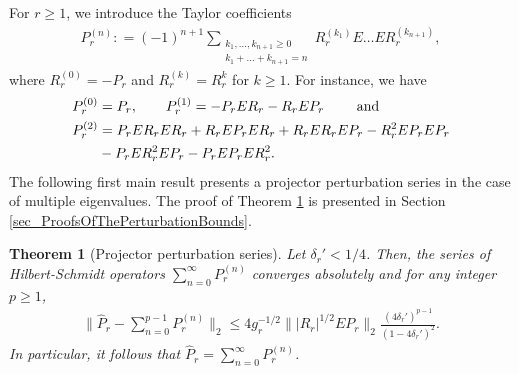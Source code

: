 \documentclass[a4paper,11pt]{article} %
\numberwithin{equation}{section}
\theoremstyle{definition}
\theoremstyle{remark}
\theoremstyle{plain}
\newtheorem{theorem}[definition]{Theorem}
\begin{document}
For $r\geq 1$, we introduce the Taylor coefficients 
\begin{align}
  P_{r}^{ (n) }: = ( - 1 )^{ n + 1 } 
                   \sum_{ \substack{ k_{1},  \dots,  k_{ n + 1 } \ge 0 \\
                                     k_{1} + \dots + k_{ n + 1 } =   n
                                   }
                        }
                        R_{r}^{ ( k_{1} ) } E \dots E R_{r}^{ ( k_{ n + 1 } ) }, 
\end{align}
where \( R_{r}^{ ( 0 ) } = - P_{r} \) and
\( R_{r}^{ ( k ) } = R_{r}^{ k } \) for \( k \ge 1 \).
For instance, we have
\begin{align}
  P_{r}^{(0)} & = P_{r}, \qquad 
  P_{r}^{(1)}   = - P_{r} E R_{r} - R_{r} E P_{r} \qquad \text{ and } \qquad  \\
  \notag
  P_{r}^{(2)} & = P_r E R_r E R_r + R_r E P_r E R_r + R_r E R_r E P_r - R_r^2 E  P_r E P_r \\
              & - P_r E R_r^2 E P_r - P_r E P_r E R_r^2.
  \notag
\end{align}
The following first main result presents a projector perturbation series in the case of multiple eigenvalues. 
The proof of Theorem \ref{thm_ProjectorPerturbationSeries} is presented in Section \ref{sec_ProofsOfThePerturbationBounds}.

\begin{theorem}[Projector perturbation series]%
  \label{thm_ProjectorPerturbationSeries}
  Let \( \delta_{r}' < 1 / 4 \). 
  Then, the series of Hilbert-Schmidt operators 
  $ \sum_{n = 0}^{\infty} P_{r}^{ (n) } $ converges absolutely and for any
  integer \( p \ge 1 \), 
  \begin{align}
        \| \widehat{P}_{r} - \sum_{n = 0}^{p - 1} P_{r}^{ (n) } \|_{2} 
    \le 
        4 g_{r}^{-1/2} 
        \| | R_{r} |^{1/2} E P_{r} \|_{2} 
        \frac{ ( 4 \delta_{r}' )^{p - 1} }{ (1 - 4 \delta_{r}')^{2} }.
  \end{align}
  In particular, it follows that \( \widehat{P}_{r} = \sum_{n = 0}^{\infty} P_{r}^{ (n) } \).
\end{theorem}%
\end{document}
